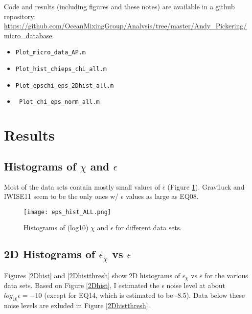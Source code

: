 \documentclass[11pt]{article}
\begin{document}
Code and results (including figures and these notes) are available in a github repository: \url{https://github.com/OceanMixingGroup/Analysis/tree/master/Andy_Pickering/micro_database}

\begin{itemize}

\item \verb+Plot_micro_data_AP.m+

\item \verb+Plot_hist_chieps_chi_all.m+

\item \verb+Plot_epschi_eps_2Dhist_all.m+

\item \verb+ Plot_chi_eps_norm_all.m+

\end{itemize}






\section{Results}




\clearpage
\subsection{Histograms of $\chi$ and $\epsilon$}

Most of the data sets contain mostly small values of $\epsilon$ (Figure \ref{chiepshists}). Graviluck and IWISE11 seem to be the only ones w/ $\epsilon$ values as large as EQ08.

\begin{figure}[htbp]
\texttt{[image: eps\_hist\_ALL.png]}
\caption{Histograms of (log10)  $\chi$ and $\epsilon$ for different data sets.}
\label{chiepshists}
\end{figure}




\clearpage
\subsection{2D Histograms of $\epsilon_{\chi}$ vs $\epsilon$}

Figures \ref{2Dhist} and \ref{2Dhistthresh} show 2D histograms of $\epsilon_{\chi}$ vs $\epsilon$ for the various data sets. Based on Figure \ref{2Dhist}, I estimated the $\epsilon$ noise level at about $log_{10}\epsilon=-10$ (except for EQ14, which is estimated to be -8.5). Data below these noise levels are exluded in Figure \ref{2Dhistthresh}.
\end{document}
